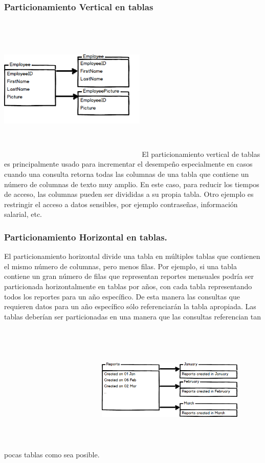 \documentclass[twoside,twocolumn]{article}
\begin{document}
\subsubsection{Particionamiento Vertical en tablas}
\includegraphics[width=7cm, height=7cm]{Imagenes/img1.png}
El particionamiento vertical de tablas es principalmente usado para 
incrementar el desempeño especialmente en casos cuando una consulta
 retorna todas las columnas de una tabla que contiene un número de
  columnas de texto muy amplio. En este caso, para reducir los tiempos 
  de acceso, las columnas pueden ser divididas a su propia tabla. 
  Otro ejemplo es restringir el acceso a datos sensibles, por ejemplo 
  contraseñas, información salarial, etc.
\subsubsection{Particionamiento Horizontal en tablas.}
El particionamiento horizontal divide una tabla en múltiples tablas que
 contienen el mismo número de columnas, pero menos filas. Por ejemplo, 
 si una tabla contiene un gran número de filas que representan reportes
  mensuales podría ser particionada horizontalmente en tablas por años, 
  con cada tabla representando todos los reportes para un año específico.
   De esta manera las consultas que requieren datos para un año específico
    sólo referenciarán la tabla apropiada. Las tablas deberían ser particionadas
     en una manera que las consultas referencian tan pocas tablas como sea posible.
\includegraphics[width=7cm, height=7cm]{Imagenes/img2.png}
\end{document}
